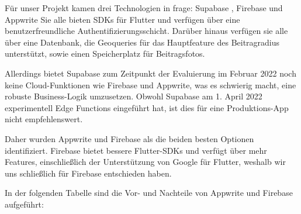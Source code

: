 


Für unser Projekt kamen drei Technologien in frage: Supabase \cite{supabase}, Firebase\cite{firebase} und Appwrite\cite{appwrite} Sie alle bieten SDKs für Flutter und verfügen über eine benutzerfreundliche Authentifizierungsschicht. Darüber hinaus verfügen sie alle über eine Datenbank, die Geoqueries für das Hauptfeature des Beitragradius unterstützt, sowie einen Speicherplatz für Beitragsfotos.

Allerdings bietet Supabase zum Zeitpunkt der Evaluierung im Februar 2022 noch keine Cloud-Funktionen wie Firebase und Appwrite, was es schwierig macht, eine robuste Business-Logik umzusetzen. Obwohl Supabase am 1. April 2022 experimentell Edge Functions eingeführt hat, ist dies für eine Produktions-App nicht empfehlenswert.

Daher wurden Appwrite und Firebase als die beiden besten Optionen identifiziert. Firebase bietet bessere Flutter-SDKs und verfügt über mehr Features, einschließlich der Unterstützung von Google für Flutter, weshalb wir uns schließlich für Firebase entschieden haben.

In der folgenden Tabelle sind die Vor- und Nachteile von Appwrite und Firebase aufgeführt:










